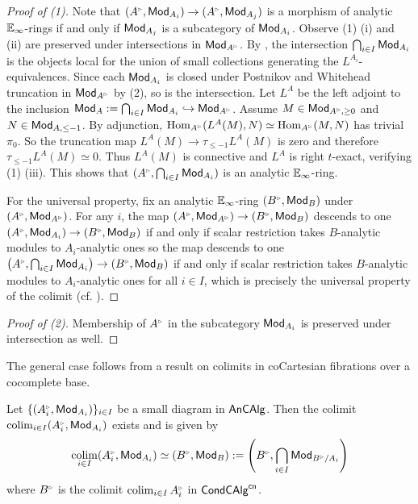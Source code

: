 \begin{proof}[Proof of (1)]
    Note that $(A^{\tri},\Mod_{A_{i}})\to(A^{\tri},\Mod_{A_{j}})$ is a morphism of analytic $\mathbb{E}_{\infty}$-rings if and only if $\mathsf{Mod}_{A_{j}}$ is a subcategory of $\mathsf{Mod}_{A_{i}}$. Observe  (1) (i) and (ii) are preserved under intersections in $\Mod_{A^{\tri}}$. By \cite[Lem. 5.5.4.18]{HTT}, the intersection $\bigcap_{i\in I}\mathsf{Mod}_{A_{i}}$ is the objects local for the union of small collections generating the $L^{A_{i}}$-equivalences. Since each $\mathsf{Mod}_{A_{i}}$ is closed under Postnikov and Whitehead truncation in $\Mod_{A^{\tri}}$ by  (2), so is the intersection. Let $L^{A}$ be the left adjoint to the inclusion $\Mod_{A}:=\bigcap_{i\in I}\Mod_{A_{i}}\hookrightarrow\Mod_{A^{\tri}}$. Assume $M\in\Mod_{A^{\tri},\geq0}$ and $N\in\mathsf{Mod}_{A,\leq-1}$. By adjunction, $\Hom_{A^{\tri}}(L^{A}(M),N)\simeq\Hom_{A^{\tri}}(M,N)$ has trivial $\pi_{0}$. So the truncation map $L^{A}(M)\to\tau_{\leq-1}L^{A}(M)$ is zero and therefore $\tau_{\leq-1}L^{A}(M)\simeq0$. Thus $L^{A}(M)$ is connective and $L^{A}$ is right $t$-exact, verifying  (1) (iii). This shows that $(A^{\tri},\bigcap_{i\in I}\Mod_{A_{i}})$ is an analytic $\mathbb{E}_{\infty}$-ring. 
    
    For the universal property, fix an analytic $\mathbb{E}_{\infty}$-ring $(B^{\tri},\Mod_{B})$ under $(A^{\tri},\Mod_{A^{\tri}})$. For any $i$, the map $(A^{\tri},\Mod_{A^{\tri}})\to(B^{\tri},\Mod_{B})$ descends to one $(A^{\tri},\Mod_{A_{i}})\to(B^{\tri},\Mod_{B})$ if and only if scalar restriction takes $B$-analytic modules to $A_{i}$-analytic ones so the map descends to one $\left(A^{\tri},\bigcap_{i\in I}\Mod_{A_{i}}\right)\to(B^{\tri},\Mod_{B})$ if and only if scalar restriction takes $B$-analytic modules to $A_{i}$-analytic ones for all $i\in I$, which is precisely the universal property of the colimit (cf. \cite[Lem. 4.1.10]{CamargoSolid}). 
\end{proof}
\begin{proof}[Proof of (2)]
    Membership of $A^{\tri}$ in the subcategory $\mathsf{Mod}_{A_{i}}$ is preserved under intersection as well. 
\end{proof}
The general case follows from a result on colimits in coCartesian fibrations over a cocomplete base.
\begin{proposition}\label{prop: colimits in AnCAlg}
   Let $\{(A_{i}^{\tri},\Mod_{A_{i}})\}_{i\in I}$ be a small diagram in $\mathsf{An}\mathsf{CAlg}$. Then the colimit $\colim_{i\in I}(A_{i}^{\tri},\Mod_{A_{i}})$ exists and is given by 
   $$\colim_{i\in I}(A_{i}^{\tri},\Mod_{A_{i}})\simeq(B^{\tri},\Mod_{B}):=\left(B^{\tri},\bigcap_{i\in I}\Mod_{B^{\tri}/A_{i}}\right)$$
   where $B^{\tri}$ is the colimit $\colim_{i\in I}A^{\tri}_{i}$ in $\mathsf{Cond}\mathsf{CAlg}^{\mathsf{cn}}$. 
\end{proposition}
